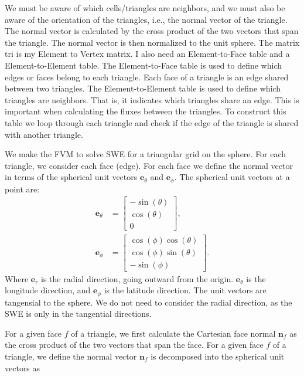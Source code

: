 We must be aware of which cells/triangles are neighbors, and we must also be aware of the orientation of the triangles, i.e., the normal vector of the triangle.
The normal vector is calculated by the cross product of the two vectors that span the triangle.
The normal vector is then normalized to the unit sphere.
The matrix tri is my Element to Vertex matrix. 
I also need an Element-to-Face table and a Element-to-Element table.
The Element-to-Face table is used to define which edges or faces belong to each triangle.
Each face of a triangle is an edge shared between two triangles.
The Element-to-Element table is used to define which triangles are neighbors. 
That is, it indicates which triangles share an edge. This is important when calculating the fluxes between the triangles.
To construct this table we loop through each triangle and check if the edge of the triangle is shared with another triangle.


We make the FVM to solve SWE for a triangular grid on the sphere.
For each triangle, we consider each face (edge).
For each face we define the normal vector in terms of the spherical unit vectors $\mathbf{e}_\theta$ and $\mathbf{e}_\phi$.
The spherical unit vectors at a point are:
\begin{align*}
    \mathbf{e}_\theta &= \begin{bmatrix}
        - \sin(\theta) \\
        \cos(\theta) \\
        0
    \end{bmatrix}, \\
    \mathbf{e}_\phi &= \begin{bmatrix}
        \cos(\phi) \cos(\theta) \\
        \cos(\phi) \sin(\theta) \\
        -\sin(\phi)
    \end{bmatrix}.
\end{align*}
Where $\mathbf{e}_r$ is the radial direction, going outward from the origin.
$\mathbf{e}_\theta$ is the longitude direction, and $\mathbf{e}_\phi$ is the latitude direction.
The unit vectors are tangensial to the sphere.
We do not need to consider the radial direction, as the SWE is only in the tangential directions.

For a given face $f$ of a triangle, we first calculate the Cartesian face normal $\mathbf{n}_f$ as the cross product of the two vectors that span the face.
For a given face $f$ of a triangle, we define the normal vector $\mathbf{n}_f$ is decomposed into the spherical unit vectors as
